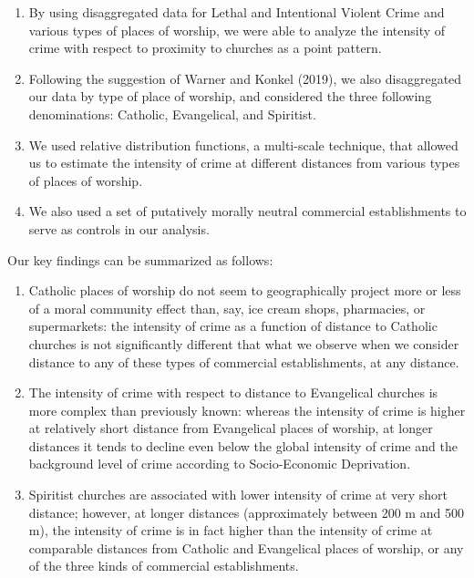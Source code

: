 \documentclass[smallextended]{svjour3}       %
\begin{document}
\begin{enumerate}
\def\labelenumi{\arabic{enumi}.}
\item
  By using disaggregated data for Lethal and Intentional Violent Crime
  and various types of places of worship, we were able to analyze the
  intensity of crime with respect to proximity to churches as a point
  pattern.
\item
  Following the suggestion of Warner and Konkel (2019), we also
  disaggregated our data by type of place of worship, and considered the
  three following denominations: Catholic, Evangelical, and Spiritist.
\item
  We used relative distribution functions, a multi-scale technique, that
  allowed us to estimate the intensity of crime at different distances
  from various types of places of worship.
\item
  We also used a set of putatively morally neutral commercial
  establishments to serve as controls in our analysis.
\end{enumerate}

Our key findings can be summarized as follows:

\begin{enumerate}
\def\labelenumi{\arabic{enumi}.}
\item
  Catholic places of worship do not seem to geographically project more
  or less of a moral community effect than, say, ice cream shops,
  pharmacies, or supermarkets: the intensity of crime as a function of
  distance to Catholic churches is not significantly different that what
  we observe when we consider distance to any of these types of
  commercial establishments, at any distance.
\item
  The intensity of crime with respect to distance to Evangelical
  churches is more complex than previously known: whereas the intensity
  of crime is higher at relatively short distance from Evangelical
  places of worship, at longer distances it tends to decline even below
  the global intensity of crime and the background level of crime
  according to Socio-Economic Deprivation.
\item
  Spiritist churches are associated with lower intensity of crime at
  very short distance; however, at longer distances (approximately
  between 200 m and 500 m), the intensity of crime is in fact higher
  than the intensity of crime at comparable distances from Catholic and
  Evangelical places of worship, or any of the three kinds of commercial
  establishments.
\end{enumerate}
\end{document}
